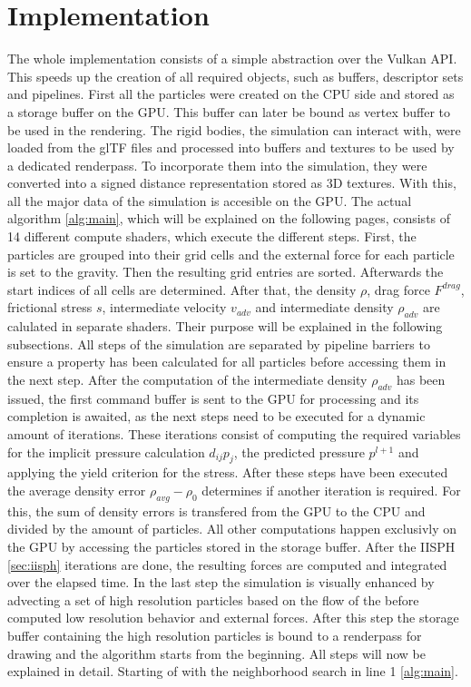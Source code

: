 \documentclass[intern]{cgMA}
\begin{document}
    \section{Implementation}\label{sec:impl}
    The whole implementation consists of a simple abstraction over the Vulkan API. This speeds up the creation of all required objects, such as buffers, descriptor sets and pipelines. First all the particles were created on the CPU side and stored as a storage buffer on the GPU. This buffer can later be bound as vertex buffer to be used in the rendering. The rigid bodies, the simulation can interact with, were loaded from the glTF files and processed into buffers and textures to be used by a dedicated renderpass. To incorporate them into the simulation, they were converted into a signed distance representation stored as 3D textures. With this, all the major data of the simulation is accesible on the GPU.
    The actual algorithm \ref*{alg:main}, which will be explained on the following pages, consists of 14 different compute shaders, which execute the different steps. First, the particles are grouped into their grid cells and the external force for each particle is set to the gravity. Then the resulting grid entries are sorted. Afterwards the start indices of all cells are determined. After that, the density $\rho$, drag force $F^{drag}$, frictional stress $s$, intermediate velocity $v_{adv}$ and intermediate density $\rho_{adv}$ are calulated in separate shaders. Their purpose will be explained in the following subsections. All steps of the simulation are separated by pipeline barriers to ensure a property has been calculated for all particles before accessing them in the next step. After the computation of the intermediate density $\rho_{adv}$ has been issued, the first command buffer is sent to the GPU for processing and its completion is awaited, as the next steps need to be executed for a dynamic amount of iterations. These iterations consist of computing the required variables for the implicit pressure calculation $d_{ij}p_{j}$, the predicted pressure $p^{l+1}$ and applying the yield criterion for the stress. After these steps have been executed the average density error $\rho_{avg} - \rho_0$ determines if another iteration is required. For this, the sum of density errors is transfered from the GPU to the CPU and divided by the amount of particles. All other computations happen exclusivly on the GPU by accessing the particles stored in the storage buffer. After the IISPH \ref{sec:iisph} iterations are done, the resulting forces are computed and integrated over the elapsed time. In the last step the simulation is visually enhanced by advecting a set of high resolution particles based on the flow of the before computed low resolution behavior and external forces. After this step the storage buffer containing the high resolution particles is bound to a renderpass for drawing and the algorithm starts from the beginning. All steps will now be explained in detail. Starting of with the neighborhood search in line 1 \ref{alg:main}.
\end{document}
